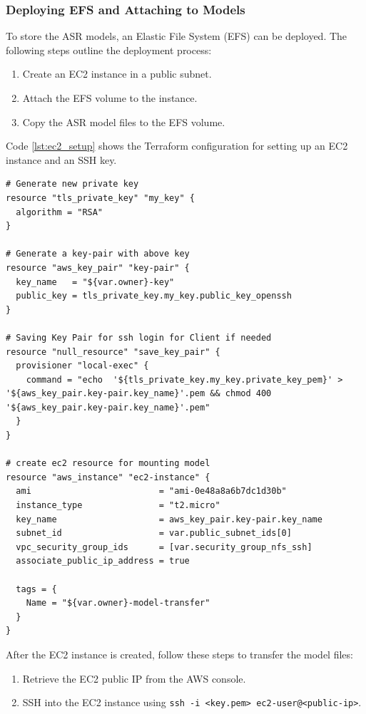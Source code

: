 \subsubsection{Deploying EFS and Attaching to Models}
To store the ASR models, an Elastic File System (EFS) can be deployed. The following steps outline the deployment process:
\begin{enumerate}
    \item Create an EC2 instance in a public subnet.
    \item Attach the EFS volume to the instance.
    \item Copy the ASR model files to the EFS volume.
\end{enumerate}


Code \ref{lst:ec2_setup} shows the Terraform configuration for setting up an EC2 instance and an SSH key. 

\begin{lstlisting}[caption={Terraform Configuration for Setting Up EC2 Instance}, label={lst:ec2_setup}]
# Generate new private key
resource "tls_private_key" "my_key" {
  algorithm = "RSA"
}

# Generate a key-pair with above key
resource "aws_key_pair" "key-pair" {
  key_name   = "${var.owner}-key"
  public_key = tls_private_key.my_key.public_key_openssh
}

# Saving Key Pair for ssh login for Client if needed
resource "null_resource" "save_key_pair" {
  provisioner "local-exec" {
    command = "echo  '${tls_private_key.my_key.private_key_pem}' > '${aws_key_pair.key-pair.key_name}'.pem && chmod 400 '${aws_key_pair.key-pair.key_name}'.pem"
  }
}

# create ec2 resource for mounting model
resource "aws_instance" "ec2-instance" {
  ami                         = "ami-0e48a8a6b7dc1d30b"
  instance_type               = "t2.micro"
  key_name                    = aws_key_pair.key-pair.key_name
  subnet_id                   = var.public_subnet_ids[0]
  vpc_security_group_ids      = [var.security_group_nfs_ssh]
  associate_public_ip_address = true

  tags = {
    Name = "${var.owner}-model-transfer"
  }
}
\end{lstlisting}

After the EC2 instance is created, follow these steps to transfer the model files:

\begin{enumerate}
    \item Retrieve the EC2 public IP from the AWS console.
    \item SSH into the EC2 instance using \texttt{ssh -i <key.pem> ec2-user@<public-ip>}.
\end{enumerate}

